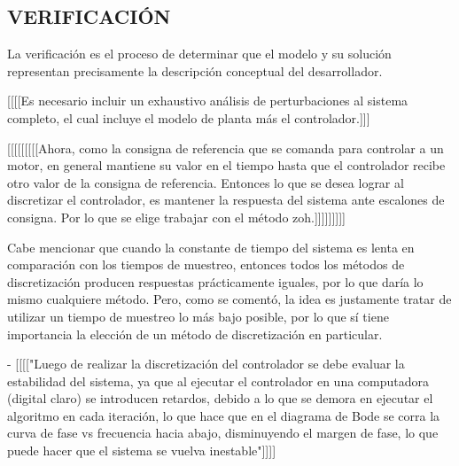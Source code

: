 \documentclass{article}
\begin{document}
\begin{sloppypar}
\subsection{VERIFICACIÓN}
\label{sec:VERIFICACIÓN}

La verificación es el proceso de determinar que el modelo y su solución representan precisamente la descripción conceptual del desarrollador.

[[[[Es necesario incluir un exhaustivo análisis de perturbaciones al sistema completo, el cual incluye el modelo de planta más el controlador.]]]























[[[[[[[[[Ahora, como la consigna de referencia que se comanda para controlar a un motor, en general mantiene su valor en el tiempo hasta que el controlador recibe otro valor de la consigna de referencia. Entonces lo que se desea lograr al discretizar el controlador, es mantener la respuesta del sistema ante escalones de consigna. Por lo que se elige trabajar con el método zoh.]]]]]]]]]%

Cabe mencionar que cuando la constante de tiempo del sistema es lenta en comparación con los tiempos de muestreo, entonces todos los métodos de discretización producen respuestas prácticamente iguales, por lo que daría lo mismo cualquiere método. Pero, como se comentó, la idea es justamente tratar de utilizar un tiempo de muestreo lo más bajo posible, por lo que sí tiene importancia la elección de un método de discretización en particular.

- [[[["Luego de realizar la discretización del controlador se debe evaluar la estabilidad del sistema, ya que al ejecutar el controlador en una computadora (digital claro) se introducen retardos, debido a lo que se demora en ejecutar el algoritmo en cada iteración, lo que hace que en el diagrama de Bode se corra la curva de fase vs frecuencia hacia abajo, disminuyendo el margen de fase, lo que puede hacer que el sistema se vuelva inestable"]]]]




\end{sloppypar}
\end{document}
